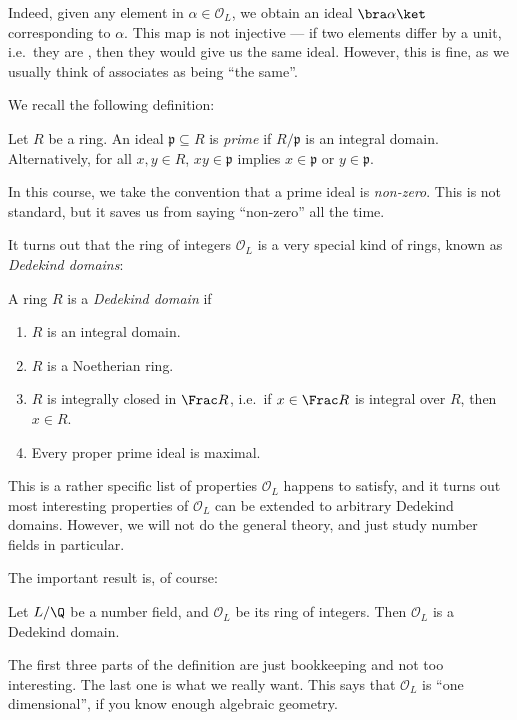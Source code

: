 \documentclass[a4paper]{article}
\begin{document}
Indeed, given any element in $\alpha \in \mathcal{O}_L$, we obtain an ideal $\bra \alpha \ket$ corresponding to $\alpha$. This map is not injective --- if two elements differ by a unit, i.e.\ they are , then they would give us the same ideal. However, this is fine, as we usually think of associates as being ``the same''.

We recall the following definition:
\begin{defi}
  Let $R$ be a ring. An ideal $\mathfrak{p} \subseteq R$ is \emph{prime} if $R/\mathfrak{p}$ is an integral domain. Alternatively, for all $x, y \in R$, $xy \in \mathfrak{p}$ implies $x \in \mathfrak{p}$ or $y \in \mathfrak{p}$.

  In this course, we take the convention that a prime ideal is \emph{non-zero}. This is not standard, but it saves us from saying ``non-zero'' all the time.
\end{defi}

It turns out that the ring of integers $\mathcal{O}_L$ is a very special kind of rings, known as \emph{Dedekind domains}:
\begin{defi}
  A ring $R$ is a \emph{Dedekind domain} if
  \begin{enumerate}
    \item $R$ is an integral domain.
    \item $R$ is a Noetherian ring.
    \item $R$ is integrally closed in $\Frac R$, i.e.\ if $x \in \Frac R$ is integral over $R$, then $x \in R$.
    \item Every proper prime ideal is maximal.
  \end{enumerate}
\end{defi}
This is a rather specific list of properties $\mathcal{O}_L$ happens to satisfy, and it turns out most interesting properties of $\mathcal{O}_L$ can be extended to arbitrary Dedekind domains. However, we will not do the general theory, and just study number fields in particular.

The important result is, of course:
\begin{prop}
  Let $L / \Q$ be a number field, and $\mathcal{O}_L$ be its ring of integers. Then $\mathcal{O}_L$ is a Dedekind domain.
\end{prop}
The first three parts of the definition are just bookkeeping and not too interesting. The last one is what we really want. This says that $\mathcal{O}_L$ is ``one dimensional'', if you know enough algebraic geometry.
\end{document}

